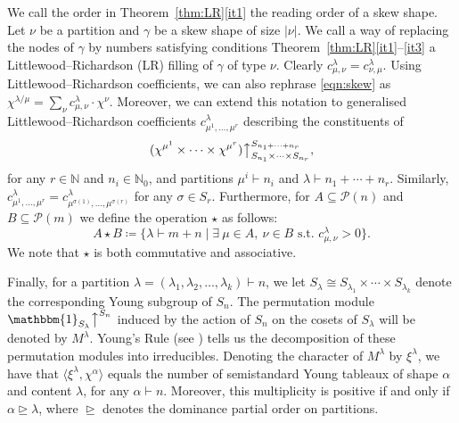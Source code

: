 \documentclass[ALCO, Unicode]{cedram}
\newcommand{\triv}{\mathbbm{1}}
\newcommand{\up}{\big\uparrow}
\newcommand{\cP}{\mathcal{P}}
\newcommand{\N}{\mathbb{N}}
\begin{document}
We call the order in Theorem~\ref{thm:LR}\ref{it1} the reading order of a skew shape. Let $\nu$ be a partition and $\gamma$ be a skew shape of size $|\nu|$. We call a way of replacing the nodes of $\gamma$ by numbers satisfying conditions Theorem~\ref{thm:LR}\ref{it1}--\ref{it3} a Littlewood--Richardson (LR) filling of $\gamma$ of type $\nu$. 
Clearly $c^\lambda_{\mu,\nu}=c^\lambda_{\nu,\mu}$. Using Littlewood--Richardson coefficients, we can also rephrase \eqref{eqn:skew} as $\chi^{\lambda/\mu}=\sum_\nu c^\lambda_{\mu,\nu}\cdot \chi^\nu$. Moreover, we can extend this notation to generalised Littlewood--Richardson coefficients $c^\lambda_{\mu^1,\dotsc,\mu^r}$ describing the constituents of
\[ (\chi^{\mu^1}\times\cdots\times\chi^{\mu^r})\up_{S_{n_1}\times\cdots\times S_{n_r}}^{S_{n_1+\cdots+n_r}}, \]
for any $r\in\N$ and $n_i\in\N_0$, and partitions $\mu^i\vdash n_i$ and $\lambda\vdash n_1+\cdots+n_r$. Similarly, $c^\lambda_{\mu^1,\dotsc,\mu^r}=c^\lambda_{\mu^{\sigma(1)},\dotsc,\mu^{\sigma(r)}}$ for any $\sigma\in S_r$. Furthermore, for $A\subseteq\cP(n)$ and $B\subseteq\cP(m)$ we define the operation $\star$ as follows:
\[ A\star B\coloneqq  \{\lambda\vdash m+n \mid \exists\ \mu\in A,\ \nu\in B\text{ s.t. }c^\lambda_{\mu,\nu}>0 \}. \]
We note that $\star$ is both commutative and associative.

Finally, for a partition $\lambda=(\lambda_1,\lambda_2,\dotsc,\lambda_k)\vdash n$, we let $S_\lambda\cong S_{\lambda_1}\times\cdots\times S_{\lambda_k}$ denote the corresponding Young subgroup of $S_n$. The permutation module $\triv_{S_\lambda}\up^{S_n}$ induced by the action of $S_n$ on the cosets of $S_\lambda$ will be denoted by $M^\lambda$. 
Young's Rule (see \cite[2.8.5]{JK}) tells us the decomposition of these permutation modules into irreducibles. Denoting the character of $M^\lambda$ by $\xi^\lambda$, we have that $\langle \xi^\lambda,\chi^\alpha\rangle$ equals the number of semistandard Young tableaux of shape $\alpha$ and content $\lambda$, for any $\alpha\vdash n$. Moreover, this multiplicity is positive if and only if $\alpha\trianglerighteq\lambda$, where $\trianglerighteq$ denotes the dominance partial order on partitions.
\end{document}
